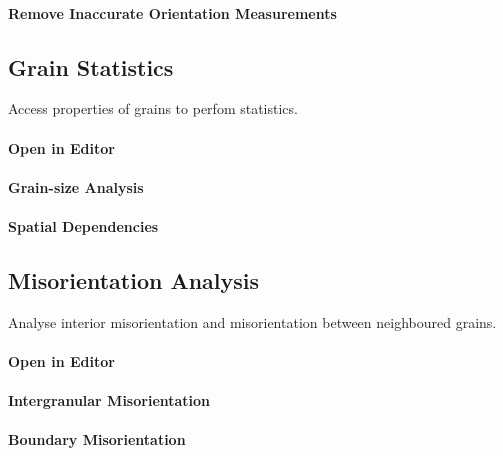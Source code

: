 \documentclass{article}
\begin{document}
			\paragraph{Remove Inaccurate Orientation Measurements}
		
		\subsection{Grain Statistics}

		
                     \begin{par}
Access properties of grains to perfom statistics.
\end{par} \vspace{1em}

                  
			\paragraph{Open in Editor}
		
			\paragraph{Grain-size Analysis}
		
			\paragraph{Spatial Dependencies}
		
		\subsection{Misorientation Analysis}

		
                     \begin{par}
Analyse interior misorientation and misorientation between neighboured grains.
\end{par} \vspace{1em}

                  
			\paragraph{Open in Editor}
		
			\paragraph{Intergranular Misorientation}
		
			\paragraph{Boundary Misorientation}
		
\end{document}

